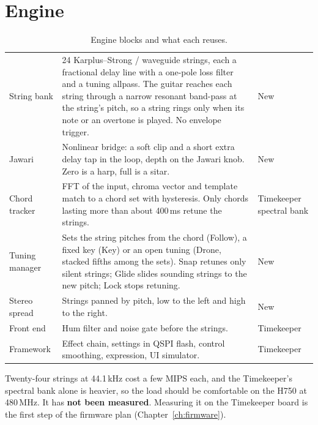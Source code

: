 \section{Engine}
\begin{table}[H]
  \small\renewcommand{\arraystretch}{1.12}
  \caption{Engine blocks and what each reuses.}\label{tab:engine}
  \begin{tabularx}{\textwidth}{@{}>{\raggedright\arraybackslash}p{28mm} L >{\raggedright\arraybackslash}p{26mm}@{}}
    \toprule
     &  &  \\
    \midrule
    String bank & 24 Karplus--Strong / waveguide strings, each a fractional delay line with a one-pole loss filter and a tuning allpass. The guitar reaches each string through a narrow resonant band-pass at the string's pitch, so a string rings only when its note or an overtone is played. No envelope trigger. & New \\
    Jawari & Nonlinear bridge: a soft clip and a short extra delay tap in the loop, depth on the Jawari knob. Zero is a harp, full is a sitar. & New \\
    Chord tracker & FFT of the input, chroma vector and template match to a chord set with hysteresis. Only chords lasting more than about 400\,ms retune the strings. & Timekeeper spectral bank \\
    Tuning manager & Sets the string pitches from the chord (Follow), a fixed key (Key) or an open tuning (Drone, stacked fifths among the sets). Snap retunes only silent strings; Glide slides sounding strings to the new pitch; Lock stops retuning. & New \\
    Stereo spread & Strings panned by pitch, low to the left and high to the right. & New \\
    Front end & Hum filter and noise gate before the strings. & Timekeeper \\
    Framework & Effect chain, settings in QSPI flash, control smoothing, expression, UI simulator. & Timekeeper \\
    \bottomrule
  \end{tabularx}
\end{table}

Twenty-four strings at 44.1\,kHz cost a few MIPS each, and the Timekeeper's spectral bank alone is heavier, so the load should be comfortable on the H750 at 480\,MHz. It has \textbf{not been measured}. Measuring it on the Timekeeper board is the first step of the firmware plan (Chapter~\ref{ch:firmware}).

